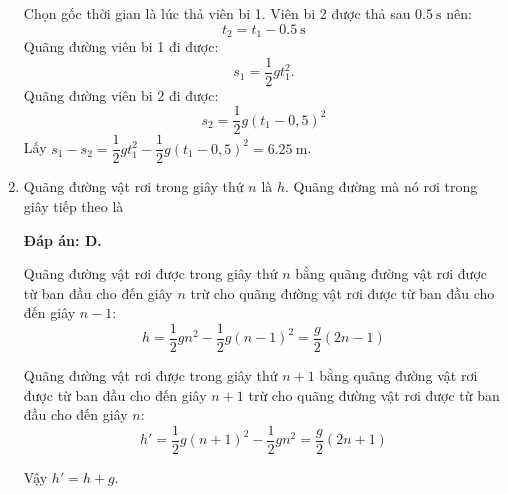 \begin{enumerate}[label=\bfseries Câu \arabic*:]
{		Chọn gốc thời gian là lúc thả viên bi 1. Viên bi 2 được thả sau $\SI{0,5}{\second}$ nên:
		$$t_2=t_1-\SI{0,5}{\second}$$
		Quãng đường viên bi 1 đi được:
		$$s_1=\frac{1}{2}gt_1^2.$$
		Quãng đường viên bi 2 đi được:
		$$s_2=\frac{1}{2}g(t_1-0,5)^2$$
		Lấy $s_1-s_2=\dfrac{1}{2}gt_1^2-\dfrac{1}{2}g(t_1-0,5)^2=\SI{6,25}{\meter}$.
		
		
	}
	\item {}
	
	\cauhoi
	{Quãng đường vật rơi trong giây thứ $n$ là $h$. Quãng đường mà nó rơi trong giây tiếp theo là
		
		
	}
	\loigiai
	{\textbf{Đáp án: D.}
		
		Quãng đường vật rơi được trong giây thứ $n$ bằng quãng đường vật rơi được từ ban đầu cho đến giây $n$ trừ cho quãng đường vật rơi được từ ban đầu cho đến giây $n-1$: $$h=\dfrac{1}{2}gn^2-\dfrac{1}{2}g(n-1)^2=\dfrac{g}{2}(2n-1)$$
		
		Quãng đường vật rơi được trong giây thứ $n+1$ bằng quãng đường vật rơi được từ ban đầu cho đến giây $n+1$ trừ cho quãng đường vật rơi được từ ban đầu cho đến giây $n$:
		$$h'=\dfrac{1}{2}g(n+1)^2-\dfrac{1}{2}gn^2 = \dfrac{g}{2}(2n+1)$$
		
		Vậy $h'=h+g$.
		
		
	}
\end{enumerate}

\whiteBGstarEnd

